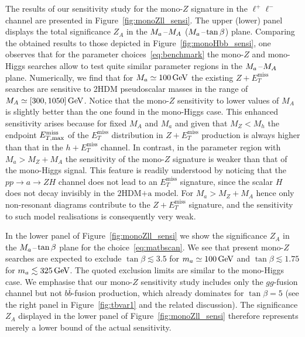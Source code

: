 \documentclass[a4paper, 11pt,notoc]{article}
\newcommand{\MET}{\ensuremath{E_T^\mathrm{miss}}\xspace}
\newcommand{\mA}{\ensuremath{M_{A}}\xspace}
\newcommand{\ma}{\ensuremath{M_{a}}\xspace}
\newcommand{\hdma}{\ensuremath{\textrm{2HDM+a}}\xspace}
\begin{document}
The results of our sensitivity study for the mono-$Z$ signature in the $\ell^+ \ell^-$ channel are presented in Figure~\ref{fig:monoZll_sensi}. The upper (lower) panel displays the total significance $Z_A$  in the $\ma\hspace{0.25mm}$--$\hspace{0.25mm}\mA$ ($\ma\hspace{0.25mm}$--$\hspace{0.25mm}\tan \beta$) plane. Comparing the obtained results to those depicted in Figure~\ref{fig:monoHbb_sensi}, one observes that for the parameter choices~\eqref{eq:benchmark} the mono-$Z$ and mono-Higgs searches allow to test quite similar parameter regions in the $\ma\hspace{0.25mm}$--$\hspace{0.25mm}\mA$ plane. Numerically, we find  that for $\ma \simeq 100 \, {\rm GeV}$  the existing $Z + \MET$ searches are sensitive to 2HDM pseudoscalar masses  in the range of $\mA \simeq [300, 1050] \, {\rm GeV}$. Notice that the mono-$Z$ sensitivity to lower values of $M_A$ is slightly better than the one found in the mono-Higgs case. This enhanced sensitivity arises because for fixed $M_A$ and $M_a$ and given that $M_Z < M_h$ the endpoint $E_{T, \rm max}^{\rm miss}$ of the $\MET$ distribution in $Z+ \MET$ production is always higher  than that in  the $h+ \MET$ channel. In contrast, in the parameter region with $M_a > M_Z + M_A$ the sensitivity of the mono-$Z$ signature is weaker than that of the mono-Higgs  signal. This feature is readily understood by noticing that the $pp \to a \to Z H$ channel does not lead to an $\MET$ signature, since the scalar $H$ does not decay invisibly in the \hdma model. For $M_a > M_Z + M_A$ hence only non-resonant diagrams contribute to the $Z+\MET$ signature, and the sensitivity to such model realisations is consequently very weak. 

 In the lower panel of Figure~\ref{fig:monoZll_sensi} we show the significance $Z_A$ in the $\ma\hspace{0.25mm}$--$\hspace{0.25mm}\tan \beta$ plane for the choice~\eqref{eq:matbscan}.   We see that present mono-$Z$ searches are expected to exclude $\tan \beta \lesssim 3.5$ for $m_a \simeq 100 \, {\rm GeV}$ and $\tan \beta \lesssim 1.75$ for $m_a \lesssim 325 \, {\rm GeV}$. The quoted exclusion limits are similar to  the mono-Higgs case. We emphasise that our mono-$Z$ sensitivity study includes only the $gg$-fusion channel but not $b \bar b$-fusion production, which already dominates for  $\tan \beta = 5$ (see the right  panel in Figure~\ref{fig:tbvar1} and the related discussion). The significance $Z_A$ displayed  in the lower panel of Figure~\ref{fig:monoZll_sensi}  therefore represents  merely a lower bound of the actual sensitivity.
\end{document}

